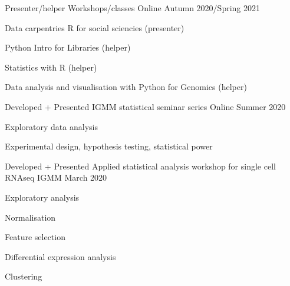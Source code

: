 


\begin{cventries}


\cventry
{Presenter/helper} %
{Workshops/classes} %
{Online} %
{Autumn 2020/Spring 2021} %
{ %
  \begin{cvitems}
    \item {
      Data carpentries R for social sciencies (presenter)
    }
    \item {
      Python Intro for Libraries (helper)
    }
    \item {
      Statistics with R (helper)
    }
    \item {
      Data analysis and visualisation with Python for Genomics (helper)
    }
  \end{cvitems}
}
\cventry
{Developed + Presented} %
{IGMM statistical seminar series} %
{Online} %
{Summer 2020} %
{ %
  \begin{cvitems}
    \item {
      Exploratory data analysis
    }
    \item {
      Experimental design, hypothesis testing, statistical power
    }
  \end{cvitems}
}


\cventry
{Developed + Presented} %
{Applied statistical analysis workshop for single cell RNAseq} %
{IGMM} %
{March 2020} %
{ %
  \begin{cvitems}
    \item 
      Exploratory analysis
    \item 
      Normalisation
    \item
      Feature selection
    \item
      Differential expression analysis
    \item
      Clustering
  \end{cvitems}
}


\end{cventries}
